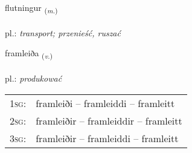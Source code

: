 \documentclass[frontgrid, backgrid]{flacards}\usepackage[]{graphicx}\usepackage[]{xcolor}
\begin{document}
\renewcommand{\flhead}{\vskip5pt \fboxsep=0pt {\small\bfseries\footnotesize Nafnorð | Noun}}
\renewcommand{\fcfoot}{\vskip5pt \fboxsep=0pt \hspace{2pt}{\small\bfseries\footnotesize 2K}}

\renewcommand{\blhead}{\vskip5pt {\small\bfseries\footnotesize Nafnorð | Noun }}
\renewcommand{\bcfoot}{\vskip5pt \hspace{2pt}{\small\bfseries\footnotesize 2K}}


{flutningur \small{\textsubscript{(\textit{m.})}} \\[1ex] %
\textphonetic{[flʏhtniŋkʏr]} \\
pl.: \emph{transport; przenieść, ruszać} \\  [2ex]
\renewcommand*{\arraystretch}{0.8}
}

\renewcommand{\flhead}{\vskip5pt \fboxsep=0pt {\small\bfseries\footnotesize Sagnorð | Verb}}
\renewcommand{\fcfoot}{\vskip5pt \fboxsep=0pt \hspace{2pt}{\small\bfseries\footnotesize 2K}}

\renewcommand{\blhead}{\vskip5pt {\small\bfseries\footnotesize Sagnorð | Verb }}
\renewcommand{\bcfoot}{\vskip5pt \hspace{2pt}{\small\bfseries\footnotesize 2K}}


{framleiða \small{\textsubscript{(\textit{v.})}} \\[1ex] %
\textphonetic{[framleiða]} \\
pl.: \emph{produkować} \\  [2ex]
\renewcommand*{\arraystretch}{0.8}
\begin{tabular}{p{1cm}l}
\textsc{1sg}: & framleiði -- framleiddi -- framleitt \\ 
\textsc{2sg}: & framleiðir -- framleiddir -- framleitt \\ 
\textsc{3sg}: & framleiðir -- framleiddi -- framleitt \\ 
\end{tabular}
}
\end{document}
